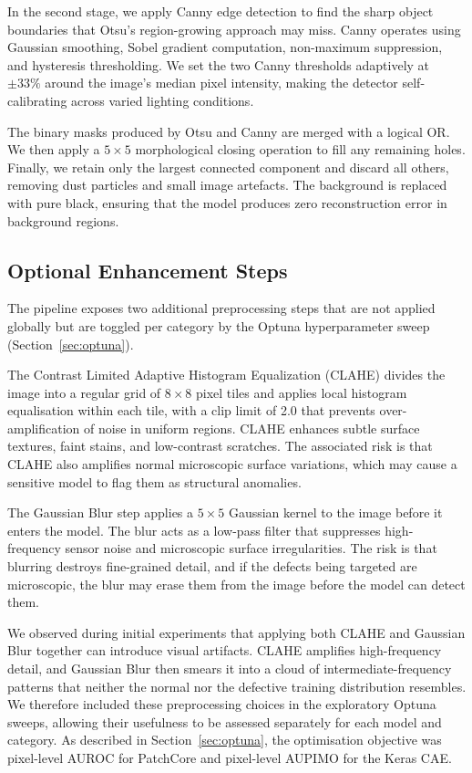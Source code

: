 \documentclass[11pt, a4paper]{article}
\begin{document}
In the second stage, we apply Canny edge detection \cite{canny1986} to find the sharp object boundaries that Otsu's region-growing approach may miss. Canny operates using Gaussian smoothing, Sobel gradient computation, non-maximum suppression, and hysteresis thresholding. We set the two Canny thresholds adaptively at $\pm 33\%$ around the image's median pixel intensity, making the detector self-calibrating across varied lighting conditions.

The binary masks produced by Otsu and Canny are merged with a logical OR. We then apply a $5 \times 5$ morphological closing operation to fill any remaining holes. Finally, we retain only the largest connected component and discard all others, removing dust particles and small image artefacts. The background is replaced with pure black, ensuring that the model produces zero reconstruction error in background regions.

\subsection{Optional Enhancement Steps}
\label{sec:optional_preprocessing}

The pipeline exposes two additional preprocessing steps that are not applied globally but are toggled per category by the Optuna hyperparameter sweep (Section~\ref{sec:optuna}).

The Contrast Limited Adaptive Histogram Equalization (CLAHE) divides the image into a regular grid of $8 \times 8$ pixel tiles and applies local histogram equalisation within each tile, with a clip limit of 2.0 that prevents over-amplification of noise in uniform regions. CLAHE enhances subtle surface textures, faint stains, and low-contrast scratches. The associated risk is that CLAHE also amplifies normal microscopic surface variations, which may cause a sensitive model to flag them as structural anomalies.

The Gaussian Blur step applies a $5 \times 5$ Gaussian kernel to the image before it enters the model. The blur acts as a low-pass filter that suppresses high-frequency sensor noise and microscopic surface irregularities. The risk is that blurring destroys fine-grained detail, and if the defects being targeted are microscopic, the blur may erase them from the image before the model can detect them.

We observed during initial experiments that applying both CLAHE and Gaussian Blur together can introduce visual artifacts. CLAHE amplifies high-frequency detail, and Gaussian Blur then smears it into a cloud of intermediate-frequency patterns that neither the normal nor the defective training distribution resembles. We therefore included these preprocessing choices in the exploratory Optuna sweeps, allowing their usefulness to be assessed separately for each model and category. As described in Section~\ref{sec:optuna}, the optimisation objective was pixel-level AUROC for PatchCore and pixel-level AUPIMO for the Keras CAE.
\end{document}
